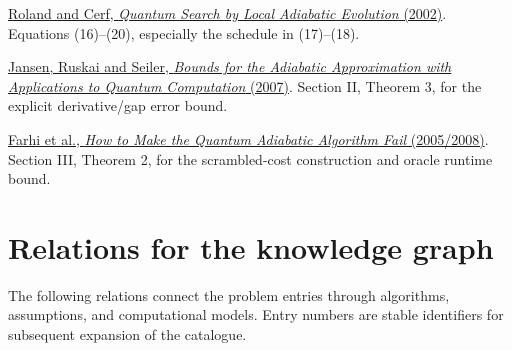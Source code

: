 \documentclass[11pt,a4paper]{article}
\theoremstyle{problemstyle}
\newcommand{\subhead}[1]{\Needspace{4\baselineskip}\par\vspace{5pt}{\bfseries #1\par}\vspace{1pt}}
\newenvironment{algorithmindex}[1]{%
  \begin{enumerate}[label={[#1.\arabic*]},leftmargin=3.4em,labelsep=0.6em,itemsep=4pt,topsep=3pt,parsep=0pt]
  \small
}{\end{enumerate}}
\begin{document}
\subhead{Algorithm}
\begin{algorithmindex}{100}
\item \href{https://arxiv.org/pdf/quant-ph/0107015}{Roland and Cerf, \emph{Quantum Search by Local Adiabatic Evolution} (2002)}. Equations (16)--(20), especially the schedule in (17)--(18).
\item \href{https://arxiv.org/pdf/quant-ph/0603175}{Jansen, Ruskai and Seiler, \emph{Bounds for the Adiabatic Approximation with Applications to Quantum Computation} (2007)}. Section II, Theorem 3, for the explicit derivative/gap error bound.
\item \href{https://arxiv.org/pdf/quant-ph/0512159}{Farhi et al., \emph{How to Make the Quantum Adiabatic Algorithm Fail} (2005/2008)}. Section III, Theorem 2, for the scrambled-cost construction and oracle runtime bound.
\end{algorithmindex}

\section*{Relations for the knowledge graph}
The following relations connect the problem entries through algorithms, assumptions, and computational models. Entry numbers are stable identifiers for subsequent expansion of the catalogue.
\end{document}

